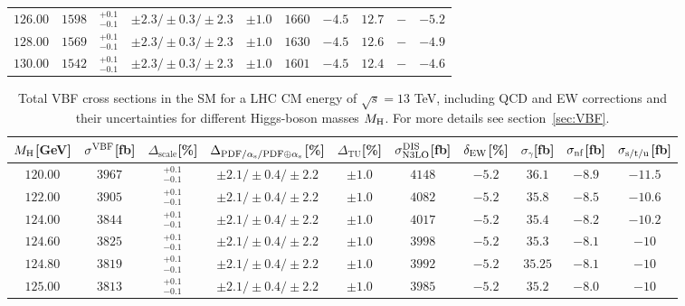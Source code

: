 \begin{table}[ht]
\begin{center}
\begin{small}
\begin{tabular}{cccccccc|cc}
$126.00$ & $1598$ & $^{+0.1}_{-0.1}$ & $\pm 2.3/\pm 0.3/\pm 2.3$ & $\pm 1.0$ & $1660$ & $-4.5$ & $12.7$ & $-$ & $-5.2$ \\
$128.00$ & $1569$ & $^{+0.1}_{-0.1}$ & $\pm 2.3/\pm 0.3/\pm 2.3$ & $\pm 1.0$ & $1630$ & $-4.5$ & $12.6$ & $-$ & $-4.9$ \\
$130.00$ & $1542$ & $^{+0.1}_{-0.1}$ & $\pm 2.3/\pm 0.3/\pm 2.3$ & $\pm 1.0$ & $1601$ & $-4.5$ & $12.4$ & $-$ & $-4.6$ \\
\bottomrule
\end{tabular}%
\end{small}%
\end{center}%
\end{table}

\begin{table}[ht]
\caption{Total VBF cross sections in the SM for a LHC CM energy of $\sqrt{s}=13$ TeV, including QCD and EW corrections
and their uncertainties for different Higgs-boson masses $M_\mathrm{H}$. For more details see section~\ref{sec:VBF}.}
\label{tab:vbf_XStot_13}
\begin{center}%
\begin{small}%
\begin{tabular}{cccccccc|cc}%
\toprule
$M_\mathrm{H}$[GeV] & $\sigma^{\mathrm{VBF}}$[fb] & $\Delta_{\mathrm{scale}}$[\%] & $\Delta_{\mathrm{PDF}/\alpha_{\mathrm{s}}/\mathrm{PDF\oplus\alpha_{\mathrm{s}}}}$[\%] & $\Delta_{\mathrm{TU}}$[\%] &
$\sigma_{\mathrm{N3LO}}^{\mathrm{DIS}}$[fb] & $\delta_{\mathrm{EW}}$[\%] & $\sigma_{\gamma}$[fb] & $\sigma_{\mbox{\scriptsize nf}}$[fb] & $\sigma_{\mbox{\scriptsize s/t/u}}$[fb]
\\
\midrule
$120.00$ & $3967$ & $^{+0.1}_{-0.1}$ & $\pm 2.1/\pm 0.4/\pm 2.2$ & $\pm 1.0$ & $4148$ & $-5.2$ & $36.1 $ & $-8.9$ & $-11.5$ \\
$122.00$ & $3905$ & $^{+0.1}_{-0.1}$ & $\pm 2.1/\pm 0.4/\pm 2.2$ & $\pm 1.0$ & $4082$ & $-5.2$ & $35.8 $ & $-8.5$ & $-10.6$ \\
$124.00$ & $3844$ & $^{+0.1}_{-0.1}$ & $\pm 2.1/\pm 0.4/\pm 2.2$ & $\pm 1.0$ & $4017$ & $-5.2$ & $35.4 $ & $-8.2$ & $-10.2$ \\
$124.60$ & $3825$ & $^{+0.1}_{-0.1}$ & $\pm 2.1/\pm 0.4/\pm 2.2$ & $\pm 1.0$ & $3998$ & $-5.2$ & $35.3 $ & $-8.1$ & $-10  $ \\
$124.80$ & $3819$ & $^{+0.1}_{-0.1}$ & $\pm 2.1/\pm 0.4/\pm 2.2$ & $\pm 1.0$ & $3992$ & $-5.2$ & $35.25$ & $-8.1$ & $-10  $ \\
$125.00$ & $3813$ & $^{+0.1}_{-0.1}$ & $\pm 2.1/\pm 0.4/\pm 2.2$ & $\pm 1.0$ & $3985$ & $-5.2$ & $35.2 $ & $-8.0$ & $-10  $ \\

\end{tabular}
\end{small}
\end{center}
\end{table}
